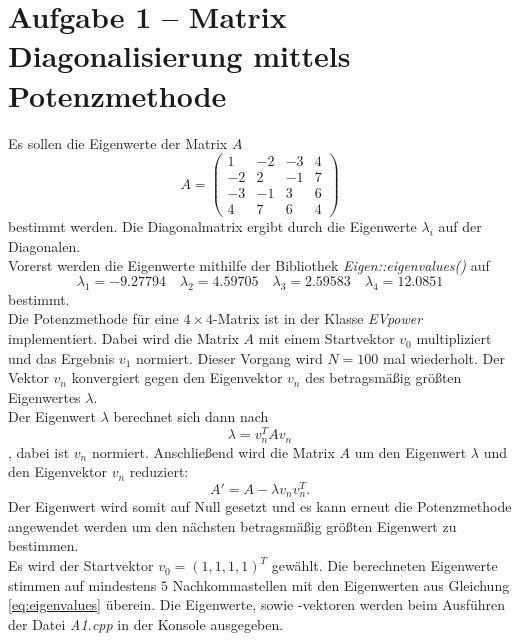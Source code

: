 \section{Aufgabe 1 – Matrix Diagonalisierung mittels Potenzmethode}
\label{sec:A1}
Es sollen die Eigenwerte der Matrix $A$
\begin{equation}
    A = \begin{pmatrix}
    1 & -2 & -3 & 4 \\
    -2 & 2 & -1 & 7 \\
    -3 & -1 & 3 & 6 \\
    4 & 7 & 6 & 4
    \end{pmatrix}
\end{equation}
bestimmt werden.
Die Diagonalmatrix ergibt durch die Eigenwerte $\lambda_i$ auf der Diagonalen.
\\
Vorerst werden die Eigenwerte mithilfe der Bibliothek \textit{Eigen::eigenvalues()} auf
\begin{equation}
    \lambda_1 = -9.27794 \quad \lambda_2 = 4.59705 \quad \lambda_3 = 2.59583 \quad \lambda_4 = 12.0851
    \label{eq:eigenvalues}
\end{equation}
bestimmt.
\\
Die Potenzmethode für eine $4 \times 4$-Matrix ist in der Klasse \textit{EVpower} implementiert.
Dabei wird die Matrix $A$ mit einem Startvektor $v_0$ multipliziert und das Ergebnis $v_1$ normiert.
Dieser Vorgang wird $N=100$ mal wiederholt.
Der Vektor $v_n$ konvergiert gegen den Eigenvektor $v_n$ des betragsmäßig größten Eigenwertes $\lambda$.
\\
Der Eigenwert $\lambda$ berechnet sich dann nach
\begin{equation}
    \lambda = v_n^T A v_n
\end{equation}
, dabei ist $v_n$ normiert.
Anschließend wird die Matrix $A$ um den Eigenwert $\lambda$ und den Eigenvektor $v_n$ reduziert:
\begin{equation}
    A' = A - \lambda v_n v_n^T.
\end{equation}
Der Eigenwert wird somit auf Null gesetzt und es kann erneut die Potenzmethode angewendet werden um den nächsten betragsmäßig größten Eigenwert zu bestimmen.
\\
Es wird der Startvektor $v_0 = (1, 1, 1, 1)^T$ gewählt.
Die berechneten Eigenwerte stimmen auf mindestens $5$ Nachkommastellen mit den Eigenwerten aus Gleichung \eqref{eq:eigenvalues} überein.
Die Eigenwerte, sowie -vektoren werden beim Ausführen der Datei \textit{A1.cpp} in der Konsole ausgegeben.